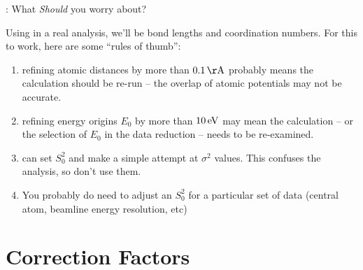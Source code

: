 \begin{slide}{ {\feff}: What {\em{Should}} you worry about?}

  Using {\feff} in a real analysis, we'll be {}
  bond lengths and coordination numbers.  For this to work, here are some
  ``rules of thumb'':

  \begin{cenpage}{90mm}

\begin{enumerate}
  \pause \item  refining atomic distances by more than $0.1\rm\,\AA$
  probably means the calculation should be re-run -- the overlap of atomic
  potentials may not be accurate.


  \pause \item  refining energy origins $E_0$ by more than $10\rm\,eV$ may
  mean the calculation -- or the selection of $E_0$ in the data reduction
  -- needs to be re-examined.

  \pause \item  {\feff} can set $S_0^2$ and make a simple attempt at
  $\sigma^2$ values.  This confuses the analysis, so don't use them.

  \pause \item  You probably do need to adjust an $S_0^2$ for a particular
  set of data (central atom, beamline energy resolution, etc)
  \end{enumerate}
  \end{cenpage}

\end{slide}

\section{Correction Factors}

